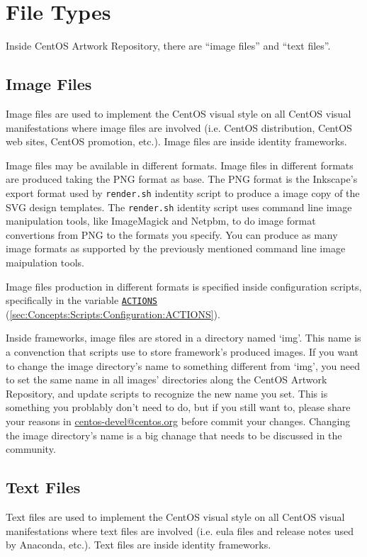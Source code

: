 
\section{File Types} 

Inside CentOS Artwork Repository, there are ``image files'' and ``text
files''.

\subsection{Image Files} 
\hypertarget{sec:Concepts:Frameworks:Image}{}

Image files are used to implement the CentOS visual style on all
CentOS visual manifestations where image files  are involved (i.e.
CentOS distribution, CentOS web sites, CentOS promotion, etc.).  Image
files are inside identity frameworks.

Image files may be available in different formats. Image files in
different formats are produced taking the PNG format as base. The PNG
format is the Inkscape's export format used by \texttt{render.sh}
indentity script to produce a image copy of the SVG design templates.
The \texttt{render.sh} identity script uses command line image
manipulation tools, like ImageMagick and Netpbm, to do image format
convertions from PNG to the formats you specify.  You can produce as
many image formats as supported by the previously mentioned command
line image maipulation tools.  

Image files production in different formats is specified inside
configuration scripts, specifically in the variable
\hyperlink{sec:Concepts:Scripts:Configuration:ACTIONS}{\texttt{ACTIONS}}
(\autoref{sec:Concepts:Scripts:Configuration:ACTIONS}).

Inside frameworks, image files are stored in a directory named `img'.
This name is a convenction that scripts use to store framework's
produced images. If you want to change the image directory's name to
something different from `img', you need to set the same name in all
images' directories along the CentOS Artwork Repository, and update
scripts to recognize the new name you set.  This is something you
problably don't need to do, but if you still want to, please share
your reasons in
\href{mailto:centos-devel@centos.org}{centos-devel@centos.org} before
commit your changes. Changing the image directory's name is a big
chanage that needs to be discussed in the community.

\subsection{Text Files}
\hypertarget{sec:Concepts:Frameworks:Files:Text}{}

Text files are used to implement the CentOS visual style on all CentOS
visual manifestations where text files are involved (i.e.  eula files
and release notes used by Anaconda, etc.). Text files are inside
identity frameworks.
